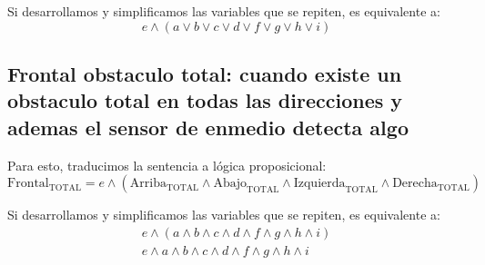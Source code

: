 Si desarrollamos y simplificamos las variables que se repiten, es equivalente a:
\begin{equation*}
    e \wedge (a \vee b \vee c \vee d \vee f \vee g \vee h \vee i)
\end{equation*}

\subsection{Frontal obstaculo total: cuando existe un obstaculo total en todas las direcciones y ademas el sensor de enmedio detecta algo}
Para esto, traducimos la sentencia a lógica proposicional:
\begin{equation*}
    \text{Frontal}_{\text{TOTAL}} = e \wedge (\text{Arriba}_{\text{TOTAL}} \wedge \text{Abajo}_{\text{TOTAL}} \wedge \text{Izquierda}_{\text{TOTAL}} \wedge \text{Derecha}_{\text{TOTAL}})
\end{equation*}

Si desarrollamos y simplificamos las variables que se repiten, es equivalente a:
\begin{gather*}
    e \wedge (a \wedge b \wedge c \wedge d \wedge f \wedge g \wedge h \wedge i) \\
    e \wedge a \wedge b \wedge c \wedge d \wedge f \wedge g \wedge h \wedge i
\end{gather*}